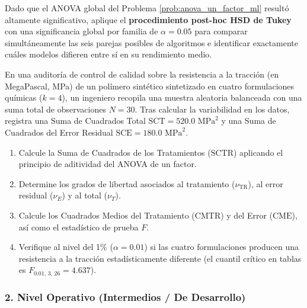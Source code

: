 \begin{problema}
	\label{prob:posthoc_tukey_ml}
	Dado que el ANOVA global del Problema \ref{prob:anova_un_factor_ml} resultó altamente significativo, aplique el \textbf{procedimiento post-hoc HSD de Tukey} con una significancia global por familia de $\alpha = 0.05$ para comparar simultáneamente las seis parejas posibles de algoritmos e identificar exactamente cuáles modelos difieren entre sí en su rendimiento medio.
\end{problema}

\begin{problema}
	\label{prob:anova_fund_particion}
	En una auditoría de control de calidad sobre la resistencia a la tracción (en MegaPascal, MPa) de un polímero sintético sintetizado en cuatro formulaciones químicas ($k = 4$), un ingeniero recopila una muestra aleatoria balanceada con una suma total de observaciones $N = 30$. Tras calcular la variabilidad en los datos, registra una Suma de Cuadrados Total $\text{SCT} = 520.0$ $\text{MPa}^2$ y una Suma de Cuadrados del Error Residual $\text{SCE} = 180.0$ $\text{MPa}^2$.
	\begin{enumerate}
		\item Calcule la Suma de Cuadrados de los Tratamientos ($\text{SCTR}$) aplicando el principio de aditividad del ANOVA de un factor.
		\item Determine los grados de libertad asociados al tratamiento ($\nu_{\text{TR}}$), al error residual ($\nu_E$) y al total ($\nu_T$).
		\item Calcule los Cuadrados Medios del Tratamiento ($\text{CMTR}$) y del Error ($\text{CME}$), así como el estadístico de prueba $F$.
		\item Verifique al nivel del 1\% ($\alpha = 0.01$) si las cuatro formulaciones producen una resistencia a la tracción estadísticamente diferente (el cuantil crítico en tablas es $F_{0.01, \, 3, \, 26} = 4.637$).
	\end{enumerate}
\end{problema}

\subsubsection*{2. Nivel Operativo (Intermedios / De Desarrollo)}

